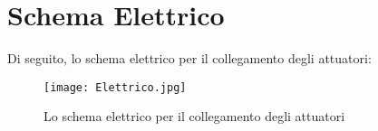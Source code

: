 \clearpage


\section{Schema Elettrico}
Di seguito, lo schema elettrico per il collegamento degli attuatori:

\begin{figure}[htbp]
\begin{center}
\texttt{[image: Elettrico.jpg]}
\caption{Lo schema elettrico per il collegamento degli attuatori}
\label{default}
\end{center}
\end{figure}
